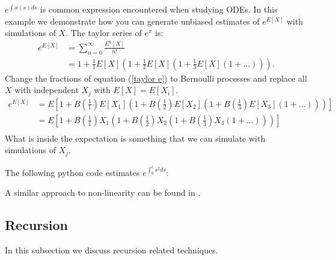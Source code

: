 \documentclass[a4paper,12pt]{article}
\begin{document}
\begin{example}[$e^{E[X]}$] \label{ex:exp int}
    $e^{\int x(s)ds}$ is common expression encountered when studying ODEs.
    In this example we demonstrate how you can generate unbiased estimates of
    $e^{E[X]}$ with simulations of $X$. The taylor series of $e^{x}$ is:
    \begin{align}
        e^{E[X]} & = \sum_{n=0}^{\infty} \frac{E^{n}[X]}{n!}     \\
                 & = 1 + \frac{1}{1}E[X]\left(1+ \frac{1}{2}E[X]
        \left(1+\frac{1}{3}E[X]\left(1+ ...\right)\right)\right). \label{taylor e}
    \end{align}
    Change the fractions of equation (\ref{taylor e}) to Bernoulli processes
    and replace all $X$ with independent $X_j$ with $E[X]=E[X_{i}]$.
    \begin{align}
        e^{E[X]} & = E
        \left[1 + B\left(\frac{1}{1}\right)E[X_1]
        \left(1+ B\left(\frac{1}{2}\right)E[X_2]
        \left(1+B\left(\frac{1}{3}\right)E[X_3]
        \left(1+ ...\right)
        \right)
        \right)
        \right]              \\
                 & = E\left[
            1 + B\left(\frac{1}{1}\right)X_1
            \left(1+ B\left(\frac{1}{2}\right)X_2
            \left(1+B\left(\frac{1}{3}\right)X_3
            \left(1+ ...\right)
            \right)
            \right)
        \right]              \\
    \end{align}
    What is inside the expectation is something that we can simulate with simulations of $X_{j}$.
\end{example}

\vspace{0.2cm}
\begin{pythonn}[$e^{E[X]}$]
    The following python code estimates $e^{\int_{0}^{t} s^{2}ds}$:
    \vspace*{0.4cm}
\end{pythonn}

\begin{related}
    A similar approach to non-linearity can be found in \cite{ermakov_monte_2019}.
\end{related}

\subsection{Recursion}
In this subsection we discuss recursion related techniques.
\end{document}
